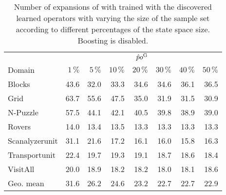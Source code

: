 \begin{table}[!h]
\centering
\caption[Expansions of \pog without boosting]{Number of expansions of \hnn with \pog trained with the discovered learned operators with varying the size of the sample set according to different percentages of the state space size. Boosting is disabled.}
\label{tab:learning_discovered_pos_boost0}
\vspace{\baselineskip}
\begin{tabular}{lrrrrrrr}
\toprule
& \multicolumn{7}{c}{$\hat po^{\text{G}}$} \\
\cmidrule(lr){2-8}
Domain     & $1\,\%$ & $5\,\%$   & $10\,\%$ & $20\,\%$ & $30\,\%$ & $40\,\%$ & $50\,\%$ \\ \midrule
Blocks         & 43.6 & 32.0 & 33.3  & 34.6  & 34.6  & 36.1  & 36.5  \\
Grid           & 63.7 & 55.6 & 47.5  & 35.0  & 31.9  & 31.5  & 30.9  \\
N-Puzzle       & 57.5 & 44.1 & 42.1  & 40.5  & 39.8  & 38.9  & 39.0  \\
Rovers         & 14.0 & 13.4 & 13.5  & 13.3  & 13.3  & 13.3  & 13.3  \\
Scanalyzerunit & 31.1 & 21.6 & 17.2  & 16.1  & 16.0  & 15.8  & 16.3  \\
Transportunit  & 22.4 & 19.7 & 19.3  & 19.1  & 18.7  & 18.6  & 18.4  \\
VisitAll       & 20.0 & 18.9 & 18.2  & 18.2  & 18.0  & 18.1  & 18.6  \\ \midrule
Geo. mean      & 31.6 & 26.2 & 24.6  & 23.2  & 22.7  & 22.7  & 22.9 \\ \bottomrule
\end{tabular}
\end{table}
